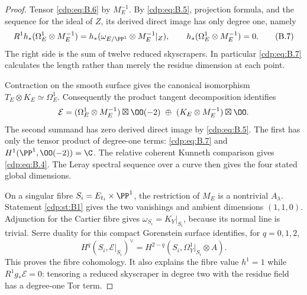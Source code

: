 \begin{proof}
Tensor \eqref{cdp:eq:B.6} by $M_E^{-1}$. By \eqref{cdp:eq:B.5}, projection formula, and the sequence for the ideal of $Z$, its derived direct image has only degree one, namely
\[
 R^1h_*(\Omega^1_E\otimes M_E^{-1})
 =h_*(\omega_{E/\PP^1}\otimes M_E^{-1}|_Z),
 \qquad h_*(\Omega^1_E\otimes M_E^{-1})=0.             \tag{B.7}\label{cdp:eq:B.7}
\]
The right side is the sum of twelve reduced skyscrapers. In particular \eqref{cdp:eq:B.7} calculates the length rather than merely the residue dimension at each point.

Contraction on the smooth surface gives the canonical isomorphism $T_E\otimes K_E\simeq\Omega^1_E$. Consequently the product tangent decomposition identifies
\[
\mathcal E=(\Omega^1_E\otimes M_E^{-1})\boxtimes\OO(-2)
 \ \oplus\ (K_E\otimes M_E^{-1})\boxtimes\OO.
\]
The second summand has zero derived direct image by \eqref{cdp:eq:B.5}. The first has only the tensor product of degree-one terms: \eqref{cdp:eq:B.7} and $H^1(\PP^1,\OO(-2))=\C$. The relative coherent Kunneth comparison gives \eqref{cdp:eq:B.4}. The Leray spectral sequence over a curve then gives the four stated global dimensions.

On a singular fibre $S_i=E_{t_i}\times\PP^1$, the restriction of $M_E$ is a nontrivial $A_\lambda$. Statement \ref{cdp:st:B1} gives the two vanishings and ambient dimensions $(1,1,0)$. Adjunction for the Cartier fibre gives $\omega_{S_i}=K_Y|_{S_i}$, because its normal line is trivial. Serre duality for this compact Gorenstein surface identifies, for $q=0,1,2$,
\[
 H^q(S_i,\mathcal E|_{S_i})^\vee
 =H^{2-q}(S_i,\Omega_Y^1|_{S_i}\otimes A).
\]
This proves the fibre cohomology. It also explains the fibre value $h^1=1$ while $R^1g_*\mathcal E=0$: tensoring a reduced skyscraper in degree two with the residue field has a degree-one Tor term.
\end{proof}


